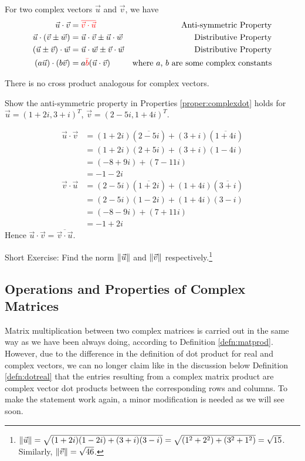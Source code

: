 \begin{proper}
\label{proper:complexdot}
For two complex vectors $\vec{u}$ and $\vec{v}$, we have
\begin{align*}
\vec{u} \cdot \vec{v} &= \textcolor{red}{\overline{\vec{v} \cdot \vec{u}}} &\text{Anti-symmetric Property} \\
\vec{u} \cdot (\vec{v} \pm \vec{w}) &= \vec{u} \cdot \vec{v} \pm \vec{u} \cdot \vec{w} &\text{Distributive Property} \\
(\vec{u} \pm \vec{v}) \cdot \vec{w} &= \vec{u} \cdot \vec{w} \pm \vec{v} \cdot \vec{w} &\text{Distributive Property} \\
(a\vec{u}) \cdot (b\vec{v}) &= a\textcolor{red}{\bar{b}}(\vec{u} \cdot \vec{v}) &\text{where $a$, $b$ are some complex constants}    
\end{align*}
\end{proper}
There is no cross product analogous for complex vectors.
\begin{exmp}
Show the anti-symmetric property in Properties \ref{proper:complexdot} holds for $\vec{u} = (1+2i, 3+i)^T$, $\vec{v} = (2-5i, 1+4i)^T$.
\end{exmp}
\begin{solution}
\begin{align*}
\vec{u} \cdot \vec{v} &= (1+2i)(\overline{2-5i}) + (3+i)(\overline{1+4i}) \\
&= (1+2i)(2+5i) + (3+i)(1-4i) \\
&= (-8+9i) + (7-11i) \\
&= -1-2i 
\end{align*}
\begin{align*}
\vec{v} \cdot \vec{u} &= (2-5i)(\overline{1+2i}) + (1+4i)(\overline{3+i}) \\
&= (2-5i)(1-2i) + (1+4i)(3-i) \\
&= (-8-9i) + (7+11i) \\
&= -1+2i 
\end{align*}
Hence $\vec{u} \cdot \vec{v} = \overline{\vec{v} \cdot \vec{u}}$.
\end{solution}

Short Exercise: Find the norm $\norm{\vec{u}}$ and $\norm{\vec{v}}$ respectively.\footnote{$\norm{\vec{u}} = \sqrt{(1+2i)(1-2i) + (3+i)(3-i)} = \sqrt{(1^2 + 2^2) + (3^2 + 1^2)} = \sqrt{15}$. Similarly, $\norm{\vec{v}} = \sqrt{46}$.}

\subsection{Operations and Properties of Complex Matrices}
Matrix multiplication between two complex matrices is carried out in the same way as we have been always doing, according to Definition \ref{defn:matprod}. However, due to the difference in the definition of dot product for real and complex vectors, we can no longer claim like in the discussion below Definition \ref{defn:dotreal} that the entries resulting from a complex matrix product are complex vector dot products between the corresponding rows and columns. To make the statement work again, a minor modification is needed as we will see soon. 

